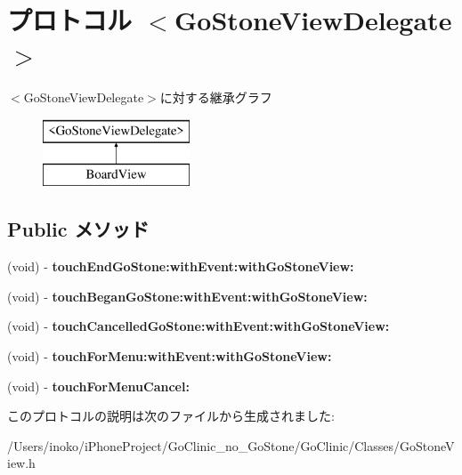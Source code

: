 \hypertarget{protocol_go_stone_view_delegate-p}{
\section{プロトコル $<$GoStoneViewDelegate$>$}
\label{protocol_go_stone_view_delegate-p}
}
$<$GoStoneViewDelegate$>$に対する継承グラフ\begin{figure}[H]
\begin{center}
\leavevmode
\includegraphics[height=2.000000cm]{protocol_go_stone_view_delegate-p}
\end{center}
\end{figure}
\subsection*{Public メソッド}
\begin{DoxyCompactItemize}
\item 
\hypertarget{protocol_go_stone_view_delegate-p_ae3e9a51bdc406bb84dac040a230f7a30}{
(void) -\/ {\bfseries touchEndGoStone:withEvent:withGoStoneView:}}
\label{protocol_go_stone_view_delegate-p_ae3e9a51bdc406bb84dac040a230f7a30}

\item 
\hypertarget{protocol_go_stone_view_delegate-p_afdeb52c59c0ee0dac201248b5d045273}{
(void) -\/ {\bfseries touchBeganGoStone:withEvent:withGoStoneView:}}
\label{protocol_go_stone_view_delegate-p_afdeb52c59c0ee0dac201248b5d045273}

\item 
\hypertarget{protocol_go_stone_view_delegate-p_a07484195a52b7ba48480dd9663068a29}{
(void) -\/ {\bfseries touchCancelledGoStone:withEvent:withGoStoneView:}}
\label{protocol_go_stone_view_delegate-p_a07484195a52b7ba48480dd9663068a29}

\item 
\hypertarget{protocol_go_stone_view_delegate-p_a5dc26eecd36a2e3bf5418bd5bddcac85}{
(void) -\/ {\bfseries touchForMenu:withEvent:withGoStoneView:}}
\label{protocol_go_stone_view_delegate-p_a5dc26eecd36a2e3bf5418bd5bddcac85}

\item 
\hypertarget{protocol_go_stone_view_delegate-p_ac00e76ede506ec4057e336b78b2446d6}{
(void) -\/ {\bfseries touchForMenuCancel:}}
\label{protocol_go_stone_view_delegate-p_ac00e76ede506ec4057e336b78b2446d6}

\end{DoxyCompactItemize}


このプロトコルの説明は次のファイルから生成されました:\begin{DoxyCompactItemize}
\item 
/Users/inoko/iPhoneProject/GoClinic\_\-no\_\-GoStone/GoClinic/Classes/GoStoneView.h\end{DoxyCompactItemize}
